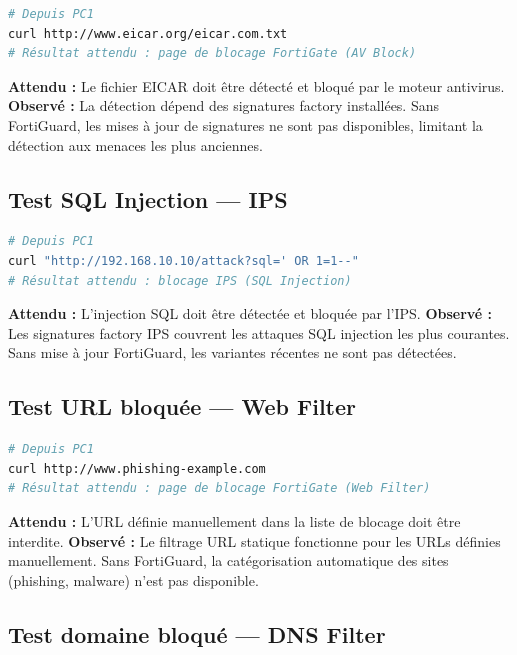 \begin{lstlisting}[language=bash, caption={Test EICAR}]
# Depuis PC1
curl http://www.eicar.org/eicar.com.txt
# Résultat attendu : page de blocage FortiGate (AV Block)
\end{lstlisting}

\noindent\textbf{Attendu :} Le fichier EICAR doit être détecté et bloqué par le moteur antivirus. \textbf{Observé :} La détection dépend des signatures factory installées. Sans FortiGuard, les mises à jour de signatures ne sont pas disponibles, limitant la détection aux menaces les plus anciennes.

\subsection{Test SQL Injection --- IPS}

\begin{lstlisting}[language=bash, caption={Test SQLi}]
# Depuis PC1
curl "http://192.168.10.10/attack?sql=' OR 1=1--"
# Résultat attendu : blocage IPS (SQL Injection)
\end{lstlisting}

\noindent\textbf{Attendu :} L'injection SQL doit être détectée et bloquée par l'IPS. \textbf{Observé :} Les signatures factory IPS couvrent les attaques SQL injection les plus courantes. Sans mise à jour FortiGuard, les variantes récentes ne sont pas détectées.

\subsection{Test URL bloquée --- Web Filter}

\begin{lstlisting}[language=bash, caption={Test Web Filter}]
# Depuis PC1
curl http://www.phishing-example.com
# Résultat attendu : page de blocage FortiGate (Web Filter)
\end{lstlisting}

\noindent\textbf{Attendu :} L'URL définie manuellement dans la liste de blocage doit être interdite. \textbf{Observé :} Le filtrage URL statique fonctionne pour les URLs définies manuellement. Sans FortiGuard, la catégorisation automatique des sites (phishing, malware) n'est pas disponible.

\subsection{Test domaine bloqué --- DNS Filter}

